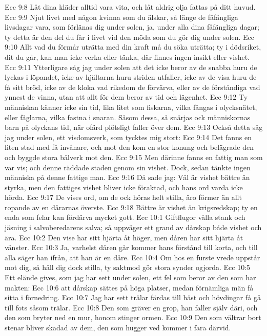 Ecc 9:8  Låt dina kläder alltid vara vita, och låt aldrig olja fattas på ditt huvud.
Ecc 9:9  Njut livet med någon kvinna som du älskar, så länge de fåfängliga livsdagar vara, som förlänas dig under solen, ja, under alla dina fåfängliga dagar; ty detta är den del du får i livet vid den möda som du gör dig under solen.
Ecc 9:10  Allt vad du förmår uträtta med din kraft må du söka uträtta; ty i dödsriket, dit du går, kan man icke verka eller tänka, där finnes ingen insikt eller vishet.
Ecc 9:11  Ytterligare såg jag under solen att det icke beror av de snabba huru de lyckas i löpandet, icke av hjältarna huru striden utfaller, icke av de visa huru de få sitt bröd, icke av de kloka vad rikedom de förvärva, eller av de förståndiga vad ynnest de vinna, utan att allt för dem beror av tid och lägenhet.
Ecc 9:12  Ty människan känner icke sin tid, lika litet som fiskarna, vilka fångas i olycksnätet, eller fåglarna, vilka fastna i snaran. Såsom dessa, så snärjas ock människornas barn på olyckans tid, när ofärd plötsligt faller över dem.
Ecc 9:13  Också detta såg jag under solen, ett visdomsverk, som tycktes mig stort:
Ecc 9:14  Det fanns en liten stad med få invånare, och mot den kom en stor konung och belägrade den och byggde stora bålverk mot den.
Ecc 9:15  Men därinne fanns en fattig man som var vis; och denne räddade staden genom sin vishet. Dock, sedan tänkte ingen människa på denne fattige man.
Ecc 9:16  Då sade jag: Väl är vishet bättre än styrka, men den fattiges vishet bliver icke föraktad, och hans ord varda icke hörda.
Ecc 9:17  De vises ord, om de ock höras helt stilla, äro förmer än allt ropande av en dårarnas överste.
Ecc 9:18  Bättre är vishet än krigsredskap; ty en enda som felar kan fördärva mycket gott.
Ecc 10:1  Giftflugor vålla stank och jäsning i salvoberedarens salva; så uppväger ett grand av dårskap både vishet och ära.
Ecc 10:2  Den vise har sitt hjärta åt höger, men dåren har sitt hjärta åt vänster.
Ecc 10:3  Ja, varhelst dåren går kommer hans förstånd till korta, och till alla säger han ifrån, att han är en dåre.
Ecc 10:4  Om hos en furste vrede uppstår mot dig, så håll dig dock stilla, ty saktmod gör stora synder ogjorda.
Ecc 10:5  Ett elände gives, som jag har sett under solen, ett fel som beror av den som har makten:
Ecc 10:6  att dårskap sättes på höga platser, medan förnämliga män få sitta i förnedring.
Ecc 10:7  Jag har sett trälar färdas till häst och hövdingar få gå till fots såsom trälar.
Ecc 10:8  Den som gräver en grop, han faller själv däri, och den som bryter ned en mur, honom stinger ormen.
Ecc 10:9  Den som vältrar bort stenar bliver skadad av dem, den som hugger ved kommer i fara därvid.
